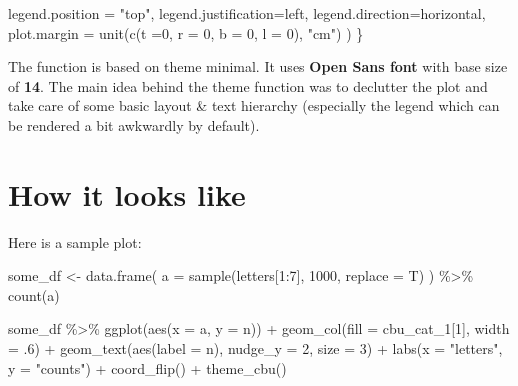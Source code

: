 \documentclass[
  letterpaper,
  DIV=11,
  numbers=noendperiod]{scrreprt}
\newenvironment{Shaded}{\begin{snugshade}}{\end{snugshade}}
\newcommand{\AttributeTok}[1]{\textcolor[rgb]{0.40,0.45,0.13}{#1}}
\newcommand{\DecValTok}[1]{\textcolor[rgb]{0.68,0.00,0.00}{#1}}
\newcommand{\FunctionTok}[1]{\textcolor[rgb]{0.28,0.35,0.67}{#1}}
\newcommand{\NormalTok}[1]{\textcolor[rgb]{0.00,0.23,0.31}{#1}}
\newcommand{\OtherTok}[1]{\textcolor[rgb]{0.00,0.23,0.31}{#1}}
\newcommand{\SpecialCharTok}[1]{\textcolor[rgb]{0.37,0.37,0.37}{#1}}
\newcommand{\StringTok}[1]{\textcolor[rgb]{0.13,0.47,0.30}{#1}}
\begin{document}
\begin{Shaded}
\begin{Highlighting}[]
          \AttributeTok{legend.position =} \StringTok{"top"}\NormalTok{,}
          \AttributeTok{legend.justification=}\StringTok{\textquotesingle{}left\textquotesingle{}}\NormalTok{,}
          \AttributeTok{legend.direction=}\StringTok{\textquotesingle{}horizontal\textquotesingle{}}\NormalTok{,}
          \AttributeTok{plot.margin =} \FunctionTok{unit}\NormalTok{(}\FunctionTok{c}\NormalTok{(}\AttributeTok{t =}\DecValTok{0}\NormalTok{, }\AttributeTok{r =} \DecValTok{0}\NormalTok{, }\AttributeTok{b =} \DecValTok{0}\NormalTok{, }\AttributeTok{l =} \DecValTok{0}\NormalTok{), }\StringTok{"cm"}\NormalTok{)}
\NormalTok{          )}
\NormalTok{\}}
\end{Highlighting}
\end{Shaded}

The function is based on theme minimal. It uses \textbf{Open Sans font}
with base size of \textbf{14}. The main idea behind the theme function
was to declutter the plot and take care of some basic layout \& text
hierarchy (especially the legend which can be rendered a bit awkwardly
by default).

\section{How it looks like}\label{how-it-looks-like}

Here is a sample plot:

\begin{Shaded}
\begin{Highlighting}[]
\NormalTok{some\_df }\OtherTok{\textless{}{-}} \FunctionTok{data.frame}\NormalTok{(}
    \AttributeTok{a =} \FunctionTok{sample}\NormalTok{(letters[}\DecValTok{1}\SpecialCharTok{:}\DecValTok{7}\NormalTok{], }\DecValTok{1000}\NormalTok{, }\AttributeTok{replace =}\NormalTok{ T)}
\NormalTok{) }\SpecialCharTok{\%\textgreater{}\%}
\FunctionTok{count}\NormalTok{(a)}

\NormalTok{some\_df }\SpecialCharTok{\%\textgreater{}\%}
\FunctionTok{ggplot}\NormalTok{(}\FunctionTok{aes}\NormalTok{(}\AttributeTok{x =}\NormalTok{ a, }\AttributeTok{y =}\NormalTok{ n)) }\SpecialCharTok{+}
\FunctionTok{geom\_col}\NormalTok{(}\AttributeTok{fill =}\NormalTok{ cbu\_cat\_1[}\DecValTok{1}\NormalTok{], }\AttributeTok{width =}\NormalTok{ .}\DecValTok{6}\NormalTok{) }\SpecialCharTok{+}
\FunctionTok{geom\_text}\NormalTok{(}\FunctionTok{aes}\NormalTok{(}\AttributeTok{label =}\NormalTok{ n), }\AttributeTok{nudge\_y =} \DecValTok{2}\NormalTok{, }\AttributeTok{size =} \DecValTok{3}\NormalTok{) }\SpecialCharTok{+}
\FunctionTok{labs}\NormalTok{(}\AttributeTok{x =} \StringTok{"letters"}\NormalTok{, }\AttributeTok{y =} \StringTok{"counts"}\NormalTok{) }\SpecialCharTok{+}
\FunctionTok{coord\_flip}\NormalTok{() }\SpecialCharTok{+}
\FunctionTok{theme\_cbu}\NormalTok{()}
\end{Highlighting}
\end{Shaded}
\end{document}
